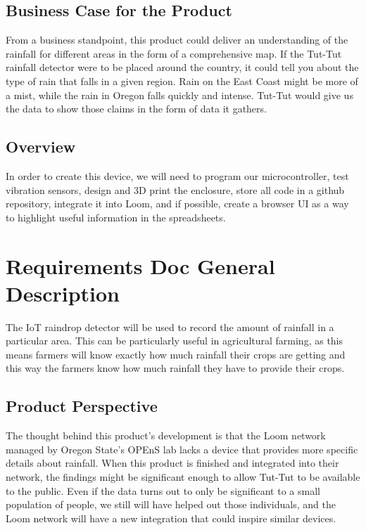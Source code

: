 \documentclass[letterpaper,10pt,draftclsnofoot,onecolumn]{article}
\begin{document}
\subsection{Business Case for the Product}
From a business standpoint, this product could deliver an understanding of the rainfall for different areas in the form of a comprehensive map. If the Tut-Tut rainfall detector were to be placed around the country, it could tell you about the type of rain that falls in a given region. Rain on the East Coast might be more of a mist, while the rain in Oregon falls quickly and intense. Tut-Tut would give us the data to show those claims in the form of data it gathers.

\subsection{Overview}
In order to create this device, we will need to program our microcontroller, test vibration sensors, design and 3D print the enclosure, store all code in a github repository, integrate it into Loom, and if possible, create a browser UI as a way to highlight useful information in the spreadsheets.

\section{Requirements Doc General Description}
The IoT raindrop detector will be used to record the amount of rainfall in a particular area. This can be particularly useful in agricultural farming, as this means farmers will know exactly how much rainfall their crops are getting and this way the farmers know how much rainfall they have to provide their crops. 

\subsection{Product Perspective}
The thought behind this product's development is that the Loom network managed by Oregon State's OPEnS lab lacks a device that provides more specific details about rainfall. When this product is finished and integrated into their network, the findings might be significant enough to allow Tut-Tut to be available to the public. Even if the data turns out to only be significant to a small population of people, we still will have helped out those individuals, and the Loom network will have a new integration that could inspire similar devices.
\end{document}
